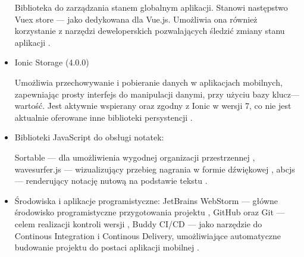 \begin{itemize}
	      Biblioteka do zarządzania stanem globalnym aplikacji. Stanowi następstwo Vuex store — jako dedykowana dla
	      Vue.js. Umożliwia ona również korzystanie z narzędzi deweloperskich pozwalających śledzić zmiany stanu aplikacji \cite{pinia}.
	\item Ionic Storage (4.0.0)

	      Umożliwia przechowywanie i pobieranie danych
	      w aplikacjach mobilnych, zapewniając prosty interfejs do manipulacji danymi, przy użyciu bazy klucz—wartość.
	      Jest aktywnie wspierany oraz zgodny z Ionic w wersji 7, co nie jest aktualnie oferowane inne biblioteki persystencji \cite{storage}.
	\item Biblioteki JavaScript do obsługi notatek:

	      Sortable — dla umożliwienia wygodnej organizacji przestrzennej \cite{sortablejs},
	      wavesurfer.js — wizualizujący przebieg nagrania w formie dźwiękowej \cite{wavesurfer},
	      abcjs — renderujący notację nutową na podstawie tekstu \cite{abcjs}.

	\item Środowiska i aplikacje programistyczne:
	      JetBrains WebStorm — główne środowisko programistyczne przygotowania projektu \cite{webstorm},
	      GitHub oraz Git — celem realizacji kontroli wersji \cite{github}\cite{git},
	      Buddy CI/CD — jako narzędzie do Continous Integration i Continous Delivery, umożliwiające automatyczne budowanie projektu do
	      postaci aplikacji mobilnej \cite{buddy}.
\end{itemize}